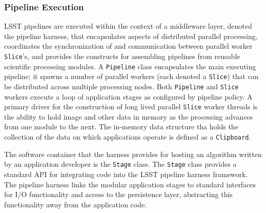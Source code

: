 
\subsubsection{Pipeline Execution}

LSST pipelines are executed within the context of a middleware layer, denoted the
pipeline harness, that encapsulates aspects of distributed parallel
processing, coordinates the synchronization of and communication
between parallel worker {\tt Slice}'s,
and provides the constructs for assembling pipelines from
reusable scientific processing modules.
A {\tt Pipeline} class encapsulates the main executing pipeline;
it spawns a number of parallel workers (each denoted a {\tt Slice})
that can be distributed across multiple processing nodes. Both {\tt Pipeline}
and {\tt Slice} workers execute a loop of application stages
as configured by pipeline policy.
A primary driver for the construction of long lived parallel {\tt Slice}
worker threads is the ability to hold image and other data in memory
as the processing advances from one module to the next. The in-memory
data structure tha holds the collection of the data on which
applications operate is defined as a {\tt Clipboard}.

The software container that the harness provides for hosting an algorithm written
by an application developer is the {\tt Stage} class.
The {\tt Stage} class provides a standard API
for integrating code into the LSST pipeline harness framework.
The pipeline harness links the modular application stages to standard interfaces for
I/O functionality and access to the persistence layer, abstracting this functionality
away from the application code.


